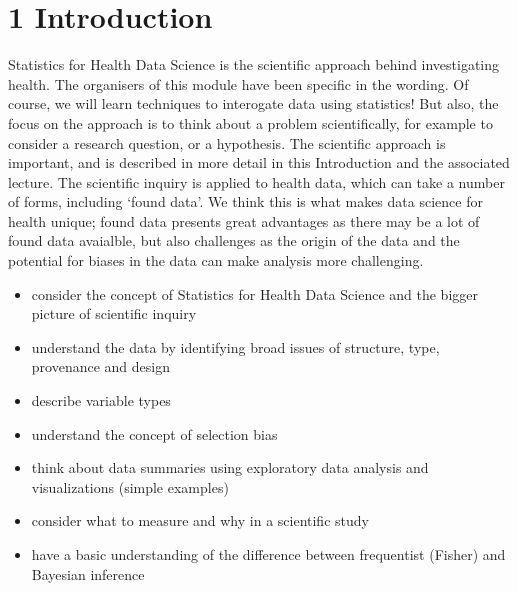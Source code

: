\documentclass[letterpaper,10pt,english]{jupyterBook}
\begin{document}
\chapter{1 Introduction}
\label{\detokenize{01. Introduction:introduction}}\label{\detokenize{01. Introduction::doc}}
\sphinxAtStartPar
Statistics for Health Data Science is the scientific approach behind investigating health. The organisers of this module have been specific in the wording. Of course, we will learn techniques to interogate data using statistics! But also, the focus on the approach is to think about a problem scientifically, for example to consider a research question, or a hypothesis. The scientific approach is important, and is described in more detail in this Introduction and the associated lecture. The scientific inquiry is applied to health data, which can take a number of forms, including ‘found data’. We think this is what makes data science for health unique; found data presents great advantages as there may be a lot of found data avaialble, but also challenges as the origin of the data and the potential for biases in the data can make analysis more challenging.


\begin{itemize}
\item {} 
\sphinxAtStartPar
consider the concept of Statistics for Health Data Science and the bigger picture of scientific inquiry

\item {} 
\sphinxAtStartPar
understand the data by identifying broad issues of structure, type, provenance and design

\item {} 
\sphinxAtStartPar
describe variable types

\item {} 
\sphinxAtStartPar
understand the concept of selection bias

\item {} 
\sphinxAtStartPar
think about data summaries using exploratory data analysis and visualizations (simple examples)

\item {} 
\sphinxAtStartPar
consider what to measure and why in a scientific study

\item {} 
\sphinxAtStartPar
have a basic understanding of the difference between frequentist (Fisher) and Bayesian inference

\end{itemize}
\end{document}
